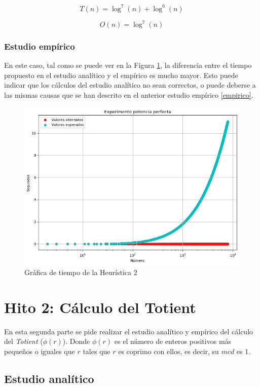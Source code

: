 \documentclass{uc3mpracticas}
\begin{document}
  $$ T(n) = \log^7(n) + \log^6(n)$$

  $$ O(n) = \log^7(n)$$




  \subsubsection{Estudio empírico}

  En este caso, tal como se puede ver en la Figura \ref{fig:h2}, la diferencia entre el tiempo propuesto en el estudio analítico y el empírico es mucho mayor. Esto puede indicar que los cálculos del estudio analítico no sean correctos, o puede deberse a las mismas causas que se han descrito en el anterior estudio empírico \ref{empirico}.

  \begin{figure}[!h]
    \centering
    \includegraphics[width=.8\linewidth]{./Images/h2.png}
    \caption{Gráfica de tiempo de la Heurística 2}
    \label{fig:h2}
  \end{figure}


  \section{Hito 2: Cálculo del Totient}

  En esta segunda parte se pide realizar el estudio analítico y empírico del cálculo del \textit{Totient} ($\phi(r)$). Donde $\phi(r)$ es el número de enteros positivos más pequeños o iguales que $r$ tales que $r$ es coprimo con ellos, es decir, su $mcd$ es 1.



  \subsection{Estudio analítico}
\end{document}
